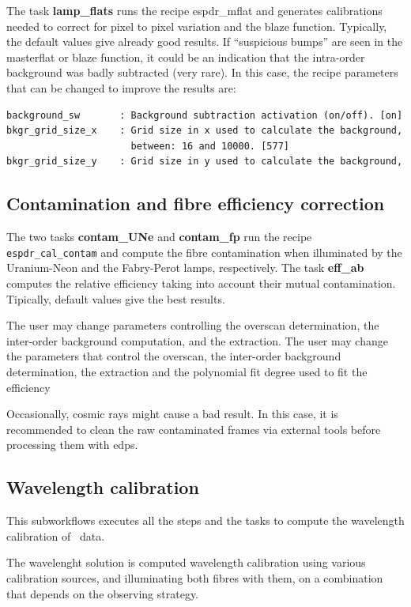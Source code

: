 The task {\bf lamp\_flats} runs the recipe espdr\_mflat and generates
calibrations needed to correct for pixel to pixel variation and the
blaze function. Typically, the default values give already good
results. If ``suspicious bumps'' are seen in the masterflat or blaze
function, it could be an indication that the intra-order background
was badly subtracted (very rare). In this case, the recipe parameters
that can be changed to improve the results are:

\begin{verbatim}
background_sw       : Background subtraction activation (on/off). [on]
bkgr_grid_size_x    : Grid size in x used to calculate the background,
                      between: 16 and 10000. [577]
bkgr_grid_size_y    : Grid size in y used to calculate the background,
\end{verbatim}

\subsection{Contamination and fibre efficiency correction}

The two tasks {\bf contam\_UNe} and {\bf contam\_fp} run the recipe
{\tt espdr\_cal\_contam} and compute the fibre contamination when
illuminated by the Uranium-Neon and the Fabry-Perot lamps,
respectively. The task {\bf eff\_ab} computes the relative efficiency
taking into account their mutual contamination. Tipically, default
values give the best results.


The user may change parameters controlling the overscan determination,
the inter-order background computation, and the extraction. The user
may change the parameters that control the overscan, the inter-order
background determination, the extraction and the polynomial fit degree
used to fit the efficiency

Occasionally, cosmic rays might cause a bad result. In this case, it
is recommended to clean the raw contaminated frames via external tools
before processing them with edps.

\subsection{Wavelength calibration}

This subworkflows executes all the steps and the tasks to compute the
wavelength calibration of \instname\ data.

The wavelenght solution is computed wavelength calibration using
various calibration sources, and illuminating both fibres with them,
on a combination that depends on the observing strategy.

